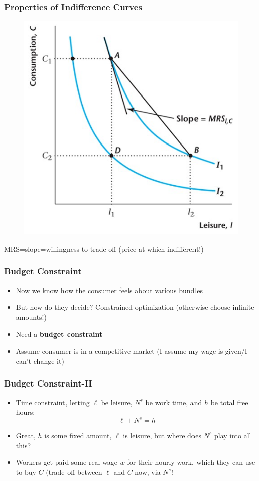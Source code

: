 \documentclass{beamer}
\begin{document}
\begin{frame}
\frametitle[alignment=center]{Properties of Indifference Curves}
\begin{figure}
\centering
\includegraphics[scale=0.5]{Figures/W_Fig_4pt2.png}
\end{figure}
MRS=slope=willingness to trade off (price at which indifferent!)
\end{frame}

\begin{frame}
\frametitle[alignment=center]{Budget Constraint}
\begin{itemize}
\item Now we know how the consumer feels about various bundles
\bigskip
\item But how do they decide? Constrained optimization (otherwise choose infinite amounts!)
\bigskip
\item Need a \textbf{budget constraint}
\bigskip
\item Assume consumer is in a competitive market (I assume my wage is given/I can't change it)
\end{itemize}
\end{frame}

\begin{frame}
\frametitle[alignment=center]{Budget Constraint-II}
\begin{itemize}
\item Time constraint, letting $\ell$ be leisure, $N^s$ be work time, and $h$ be total free hours:
$$\ell+N^s=h$$
\item Great, $h$ is some fixed amount, $\ell$ is leisure, but where does $N^s$ play into all this?
\bigskip
\item Workers get paid some real wage $w$ for their hourly work, which they can use to buy $C$ (trade off between $\ell$ and $C$ now, via $N^s$!
\end{itemize}
\end{frame}
\end{document}
